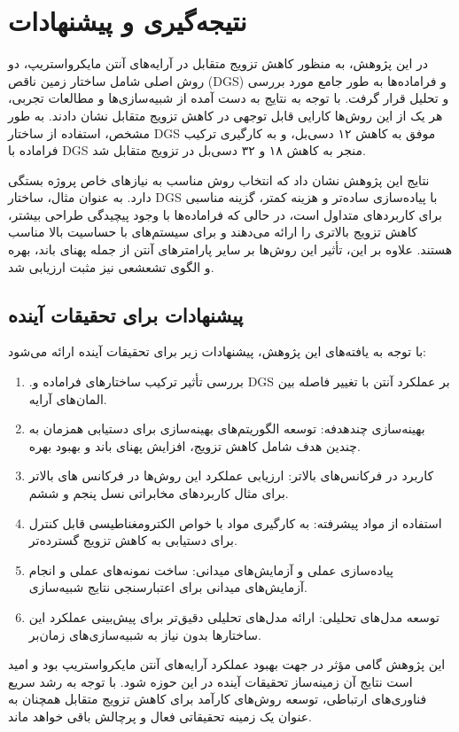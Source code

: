 \clearpage
\chapter{نتیجه‌گیری و  پیشنهادات}

در این پژوهش، به منظور کاهش تزویج متقابل در آرایه‌های آنتن مایکرواستریپ، دو روش اصلی شامل ساختار زمین ناقص (DGS) و فراماده‌ها به طور جامع مورد بررسی و تحلیل قرار گرفت. با توجه به نتایج به دست آمده از شبیه‌سازی‌ها و مطالعات تجربی، هر یک از این روش‌ها کارایی قابل توجهی در کاهش تزویج متقابل نشان دادند. به طور مشخص، استفاده از ساختار DGS موفق به کاهش ۱۲ دسی‌بل، و به کارگیری ترکیب فراماده‌ با DGS منجر به کاهش ۱۸ و ۳۲ دسی‌بل در تزویج متقابل شد.

نتایج این پژوهش نشان داد که انتخاب روش مناسب به نیازهای خاص پروژه بستگی دارد. به عنوان مثال، ساختار DGS با پیاده‌سازی ساده‌تر و هزینه کمتر، گزینه مناسبی برای کاربردهای متداول است، در حالی که فراماده‌ها با وجود پیچیدگی طراحی بیشتر، کاهش تزویج بالاتری را ارائه می‌دهند و برای سیستم‌های با حساسیت بالا مناسب هستند. علاوه بر این، تأثیر این روش‌ها بر سایر پارامترهای آنتن از جمله پهنای باند، بهره و الگوی تشعشعی نیز مثبت ارزیابی شد.


\section{
	پیشنهادات برای تحقیقات آینده
}

با توجه به یافته‌های این پژوهش، پیشنهادات زیر برای تحقیقات آینده ارائه می‌شود:
\begin{enumerate}
	\item {
	.بررسی تأثیر ترکیب ساختارهای فراماده و DGS بر عملکرد آنتن با تغییر فاصله بین المان‌های آرایه.
	}
	\item {
	بهینه‌سازی چندهدفه: توسعه الگوریتم‌های بهینه‌سازی برای دستیابی همزمان به چندین هدف شامل کاهش تزویج، افزایش پهنای باند و بهبود بهره.
	}
	\item {
	 کاربرد در فرکانس‌های بالاتر: ارزیابی عملکرد این روش‌ها در فرکانس های بالاتر برای مثال کاربردهای مخابراتی نسل پنجم و ششم.
	}
	\item {
	استفاده از مواد پیشرفته: به کارگیری مواد با خواص الکترومغناطیسی قابل کنترل برای دستیابی به کاهش تزویج گسترده‌تر.
	}
	\item {
	پیاده‌سازی عملی و آزمایش‌های میدانی: ساخت نمونه‌های عملی و انجام آزمایش‌های میدانی برای اعتبارسنجی نتایج شبیه‌سازی.
	}
	\item {
	 توسعه مدل‌های تحلیلی: ارائه مدل‌های تحلیلی دقیق‌تر برای پیش‌بینی عملکرد این ساختارها بدون نیاز به شبیه‌سازی‌های زمان‌بر.
	}
\end{enumerate}

این پژوهش گامی مؤثر در جهت بهبود عملکرد آرایه‌های آنتن مایکرواستریپ بود و امید است نتایج آن زمینه‌ساز تحقیقات آینده در این حوزه شود. با توجه به رشد سریع فناوری‌های ارتباطی، توسعه روش‌های کارآمد برای کاهش تزویج متقابل همچنان به عنوان یک زمینه تحقیقاتی فعال و پرچالش باقی خواهد ماند.

